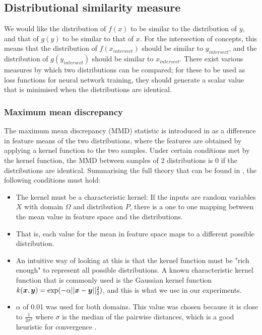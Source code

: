 \subsection{Distributional similarity measure}

We would like the distribution of $f(x)$ to be similar to the distribution of $y$, and that of $g(y)$ to be similar to that of $x$. For the intersection of concepts, this means that the distribution of $f(x_{intersect})$ should be similar to $y_{intersect}$, and the distribution of $g(y_{intersect})$ should be similar to $x_{intersect}$. There exist various measures by which two distributions can be compared; for these to be used as loss functions for neural network training, they should generate a scalar value that is minimised when the distributions are identical. 

\subsubsection{Maximum mean discrepancy}

The maximum mean discrepancy (MMD) statistic is introduced in \cite{MMDGretton} as a difference in feature means of the two distributions, where the features are obtained by applying a kernel function to the two samples. Under certain conditions met by the kernel function, the MMD between samples of 2 distributions is 0 if the distributions are identical. Summarising the full theory that can be found in \cite{MMDGretton}, the following conditions must hold:

\begin{itemize}
    \item The kernel must be a characteristic kernel: If the inputs are random variables $X$ with domain $\Omega$ and distribution $P$, there is a one to one mapping between the mean value in feature space and the distributions. \cite{KernelMeanEmbeddingReview} 
    \item That is, each value for the mean in feature space maps to a different possible distribution. 
    \item An intuitive way of looking at this is that the kernel function must be "rich enough" to represent all possible distributions. A known characteristic kernel function that is commonly used is the Gaussian kernel function $k(\boldsymbol{x}, \boldsymbol{y}) = \exp(-\alpha ||\boldsymbol{x} - \boldsymbol{y}||_2^2)$, and this is what we use in our experiments. 
    \item $\alpha$ of 0.01 was used for both domains. This value was chosen because it is close to $\frac{1}{2 \sigma^2}$ where $\sigma$ is the median of the pairwise distances, which is a good heuristic for convergence \cite{Garreau2017LargeSA} . 
\end{itemize}

